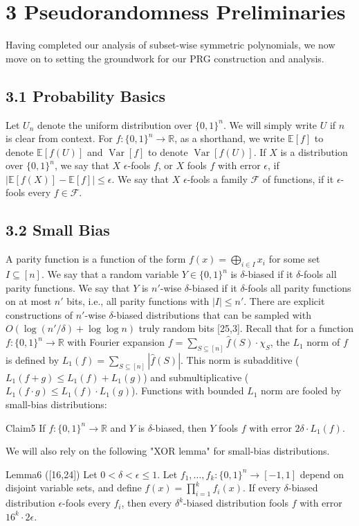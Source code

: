\section*{3 Pseudorandomness Preliminaries}
Having completed our analysis of subset-wise symmetric polynomials, we now move on to setting the groundwork for our PRG construction and analysis.
\subsection*{3.1 Probability Basics}
Let $U_n$ denote the uniform distribution over $\{0,1\}^n$. We will simply write $U$ if $n$ is clear from context. For $f:\{0,1\}^n\to\mathbb R$, as a shorthand, we write $\mathbb E[f]$ to denote $\mathbb E[f(U)]$ and $\operatorname{Var}[f]$ to denote $\operatorname{Var}[f(U)]$. If $X$ is a distribution over $\{0,1\}^n$, we say that $X$ $\epsilon$-fools $f$, or $X$ fools $f$ with error $\epsilon$, if $|\mathbb E[f(X)]-\mathbb E[f]|\le\epsilon$. We say that $X$ $\epsilon$-fools a family $\mathcal F$ of functions, if it $\epsilon$-fools every $f\in\mathcal F$.
\subsection*{3.2 Small Bias}
A parity function is a function of the form $f(x)=\bigoplus_{i\in I}x_i$ for some set $I\subseteq[n]$. We say that a random variable $Y\in\{0,1\}^n$ is $\delta$-biased if it $\delta$-fools all parity functions. We say that $Y$ is $n'$-wise $\delta$-biased if it $\delta$-fools all parity functions on at most $n'$ bits, i.e., all parity functions with $|I|\le n'$. There are explicit constructions of $n'$-wise $\delta$-biased distributions that can be sampled with $O(\log(n'/\delta)+\log\log n)$ truly random bits [25,3].
Recall that for a function $f:\{0,1\}^n\to\mathbb R$ with Fourier expansion $f=\sum_{S\subseteq[n]}\widehat f(S)\cdot\chi_S$, the $L_1$ norm of $f$ is defined by $L_1(f)=\sum_{S\subseteq[n]}|\widehat f(S)|$. This norm is subadditive ($L_1(f+g)\le L_1(f)+L_1(g)$) and submultiplicative ($L_1(f\cdot g)\le L_1(f)\cdot L_1(g)$). Functions with bounded $L_1$ norm are fooled by small-bias distributions:
\begin{authorclaim}{Claim5}
If $f:\{0,1\}^n\to\mathbb R$ and $Y$ is $\delta$-biased, then $Y$ fools $f$ with error $2\delta\cdot L_1(f)$.
\end{authorclaim}
We will also rely on the following "XOR lemma" for small-bias distributions.
\begin{authorclaim}{Lemma6 ([16,24])}
Let $0<\delta<\epsilon\le1$. Let $f_1,\ldots,f_k:\{0,1\}^n\to[-1,1]$ depend on disjoint variable sets, and define $f(x)=\prod_{i=1}^kf_i(x)$. If every $\delta$-biased distribution $\epsilon$-fools every $f_i$, then every $\delta^k$-biased distribution fools $f$ with error $16^k\cdot2\epsilon$.
\end{authorclaim}
